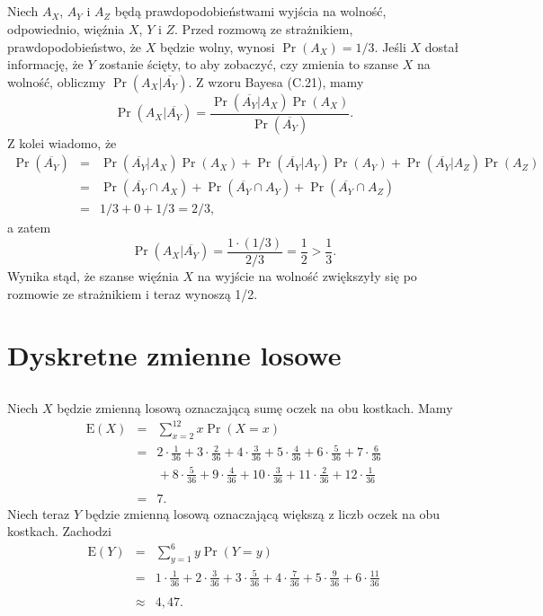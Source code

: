 \subsection{} %
Niech $A_X$, $A_Y$ i $A_Z$ będą prawdopodobieństwami wyjścia na wolność, odpowiednio, więźnia $X$, $Y$ i $Z$. Przed rozmową ze strażnikiem, prawdopodobieństwo, że $X$ będzie wolny, wynosi $\Pr(A_X)=1/3$. Jeśli $X$ dostał informację, że $Y$ zostanie ścięty, to aby zobaczyć, czy zmienia to szanse $X$ na wolność, obliczmy $\Pr(A_X|\overline{A_Y})$. Z wzoru Bayesa (C.21), mamy
\[
	\Pr(A_X|\overline{A_Y}) = \frac{\Pr(\overline{A_Y}|A_X)\Pr(A_X)}{\Pr(\overline{A_Y})}.
\]
Z kolei wiadomo, że
\begin{eqnarray*}
	\Pr(\overline{A_Y}) &=& \Pr(\overline{A_Y}|A_X)\Pr(A_X)+\Pr(\overline{A_Y}|A_Y)\Pr(A_Y)+\Pr(\overline{A_Y}|A_Z)\Pr(A_Z) \\
	&=& \Pr(\overline{A_Y}\cap A_X)+\Pr(\overline{A_Y}\cap A_Y)+\Pr(\overline{A_Y}\cap A_Z) \\
	&=& 1/3+0+1/3 = 2/3,
\end{eqnarray*}
a zatem
\[
	\Pr(A_X|\overline{A_Y}) = \frac{1\cdot (1/3)}{2/3} = \frac{1}{2}>\frac{1}{3}.
\]
Wynika stąd, że szanse więźnia $X$ na wyjście na wolność zwiększyły się po rozmowie ze strażnikiem i teraz wynoszą 1/2.

\section{Dyskretne zmienne losowe}

\subsection{} %
Niech $X$ będzie zmienną losową oznaczającą sumę oczek na obu kostkach. Mamy
\begin{eqnarray*}
	\mathrm{E}(X) &=& \sum_{x=2}^{12}x\Pr(X=x) \\
	&=& 2\cdot\frac{1}{36}+3\cdot\frac{2}{36}+4\cdot\frac{3}{36}+5\cdot\frac{4}{36}+6\cdot\frac{5}{36}+7\cdot\frac{6}{36} \\
	&& {}+8\cdot\frac{5}{36}+9\cdot\frac{4}{36}+10\cdot\frac{3}{36}+11\cdot\frac{2}{36}+12\cdot\frac{1}{36} \\\\
	&=& 7.
\end{eqnarray*}
Niech teraz $Y$ będzie zmienną losową oznaczającą większą z liczb oczek na obu kostkach. Zachodzi
\begin{eqnarray*}
	\mathrm{E}(Y) &=& \sum_{y=1}^{6}y\Pr(Y=y) \\
	&=& 1\cdot\frac{1}{36}+2\cdot\frac{3}{36}+3\cdot\frac{5}{36}+4\cdot\frac{7}{36}+5\cdot\frac{9}{36}+6\cdot\frac{11}{36} \\\\
	&\approx& 4{,}47.
\end{eqnarray*}

